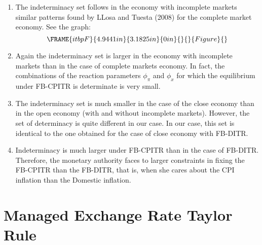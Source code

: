 \documentclass{article}
\begin{document}
\begin{enumerate}
\item The indeterminacy set follows in the economy with incomplete markets
similar patterns found by LLosa and Tuesta (2008) for the complete market
economy. See the graph:%
\begin{equation*}
\FRAME{itbpF}{4.9441in}{3.1825in}{0in}{}{}{Figure}{\special{language
"Scientific Word";type "GRAPHIC";maintain-aspect-ratio TRUE;display
"USEDEF";valid_file "T";width 4.9441in;height 3.1825in;depth
0in;original-width 10.9269in;original-height 7.0102in;cropleft "0";croptop
"1";cropright "1";cropbottom "0";tempfilename
'L5F9FV01.wmf';tempfile-properties "XPR";}}
\end{equation*}

\item Again the indeterminacy set is larger in the economy with incomplete
markets than in the case of complete markets economy. In fact, the
combinations of the reaction parameters $\phi _{\pi }$ and $\phi _{x}$ for
which the equilibrium under FB-CPITR is determinate is very small. 

\item The indeterminacy set is much smaller in the case of the close economy
than in the open economy (with and without incomplete markets). However, the
set of determinacy is quite different in our case. In our case, this set is
identical to the one obtained for the case of close economy with FB-DITR.

\item Indeterminacy is much larger under FB-CPITR than in the case of
FB-DITR. Therefore, the monetary authority faces to larger constraints in
fixing the FB-CPITR than the FB-DITR, that is, when she cares about the CPI
inflation than the Domestic inflation.
\end{enumerate}

\section{Managed Exchange Rate Taylor Rule}
\end{document}
